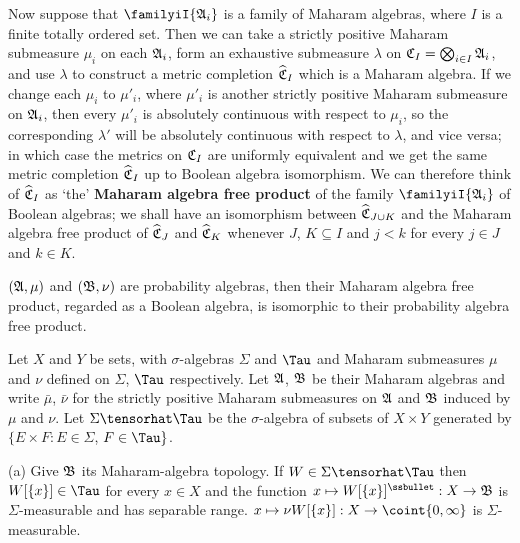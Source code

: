 Now suppose that $\familyiI{\frak A_i}$ is a family of
Maharam algebras, where $I$ is a finite totally ordered set.   Then
we can take a strictly positive Maharam submeasure $\mu_i$ on
each $\frak A_i$, form an exhaustive submeasure $\lambda$ on
$\frak C_I=\bigotimes_{i\in I}\frak A_i$, and use $\lambda$ to
construct a metric completion $\widehat{\frak C}_I$ which is a
Maharam algebra.
If we change each $\mu_i$ to $\mu'_i$, where $\mu'_i$ is
another strictly positive Maharam submeasure on
$\frak A_i$, then every $\mu'_i$ is absolutely continuous with
respect to $\mu_i$,
so the corresponding $\lambda'$ will be
absolutely continuous with respect to $\lambda$, and vice
versa;
in which case the metrics on $\frak C_I$ are uniformly equivalent
and we get the same metric completion
$\widehat{\frak C}_I$ up to Boolean algebra isomorphism.
We can therefore think of $\widehat{\frak C}_I$ as `the' {\bf Maharam
algebra free product} of the family $\familyiI{\frak A_i}$ of Boolean
algebras;   we shall have an isomorphism between
$\widehat{\frak C}_{J\cup K}$ and the Maharam algebra
free product of $\widehat{\frak C}_J$ and $\widehat{\frak C}_K$
whenever $J$, $K\subseteq I$ and $j<k$ for every $j\in J$ and $k\in K$.

 $(\frak A,\mu)$ and $(\frak B,\nu)$
are probability algebras, then
their Maharam algebra free product, regarded as a Boolean algebra, is
isomorphic to their probability algebra free product.

 Let $X$
and $Y$ be sets, with $\sigma$-algebras $\Sigma$ and $\Tau$ and Maharam
submeasures $\mu$ and $\nu$ defined on $\Sigma$, $\Tau$ respectively.
Let $\frak A$, $\frak B$ be their Maharam algebras and write $\bar\mu$,
$\bar\nu$ for the strictly positive Maharam submeasures on $\frak A$ and
$\frak B$ induced by $\mu$ and $\nu$.   Let
$\Sigma\tensorhat\Tau$ be the $\sigma$-algebra of subsets of $X\times Y$
generated by $\{E\times F:E\in\Sigma$, $F\in\Tau\}$.

(a)
Give $\frak B$ its Maharam-algebra topology.
If $W\in\Sigma\tensorhat\Tau$ then $W[\{x\}]\in\Tau$ for every $x\in X$
and the function $x\mapsto W[\{x\}]^{\ssbullet}:X\to\frak B$ is
$\Sigma$-measurable and has separable range.   
$x\mapsto\nu W[\{x\}]:X\to\coint{0,\infty}$ is $\Sigma$-measurable.

